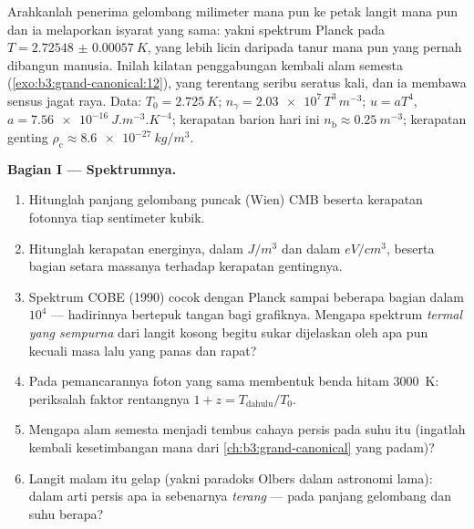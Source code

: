 \begin{problem}\label{pb:b3:photons-phonons:1}
Arahkanlah penerima gelombang milimeter mana pun ke petak langit mana
pun dan ia melaporkan isyarat yang sama: yakni spektrum Planck pada $T =
\qty{2.72548(57)}{K}$, yang lebih licin daripada tanur mana pun yang
pernah dibangun manusia. Inilah kilatan penggabungan kembali alam semesta
(\cref{exo:b3:grand-canonical:12}), yang terentang seribu seratus kali,
dan ia membawa sensus jagat raya. Data: $T_0 =
\qty{2.725}{K}$; $n_\gamma = \num{2.03e7}\,T^3\,\unit{m^{-3}}$;
$u = aT^4$, $a = \qty{7.56e-16}{J.m^{-3}.K^{-4}}$; kerapatan barion
hari ini $n_{\text{b}} \approx \qty{0.25}{m^{-3}}$; kerapatan genting
$\rho_{\text{c}} \approx \qty{8.6e-27}{kg/m^3}$.

\medskip\noindent\textbf{Bagian I --- Spektrumnya.}
\begin{enumerate}
  \item Hitunglah panjang gelombang puncak (Wien) CMB beserta kerapatan
        fotonnya tiap sentimeter kubik.
  \item Hitunglah kerapatan energinya, dalam $\unit{J/m^3}$ dan dalam
        $\unit{eV/cm^3}$, beserta bagian setara massanya terhadap
        kerapatan gentingnya.
  \item Spektrum COBE (1990) cocok dengan Planck sampai beberapa bagian
        dalam $10^4$ --- hadirinnya bertepuk tangan bagi grafiknya.
        Mengapa spektrum \emph{termal yang sempurna} dari langit kosong
        begitu sukar dijelaskan oleh apa pun kecuali masa lalu yang
        panas dan rapat?
  \item Pada pemancarannya foton yang sama membentuk benda hitam
        \qty{3000}{K}: periksalah faktor rentangnya $1 + z =
        T_{\text{dahulu}}/T_0$.
  \item Mengapa alam semesta menjadi tembus cahaya persis pada suhu itu
        (ingatlah kembali kesetimbangan mana dari
        \cref{ch:b3:grand-canonical} yang padam)?
  \item Langit malam itu gelap (yakni paradoks Olbers dalam astronomi
        lama): dalam arti persis apa ia sebenarnya \emph{terang} --- pada
        panjang gelombang dan suhu berapa?
\end{enumerate}


\end{problem}
